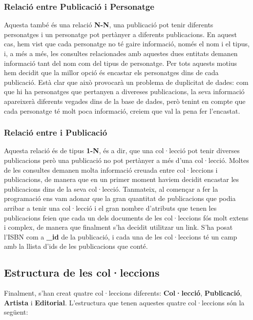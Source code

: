 \documentclass{article}
\begin{document}
\subsubsection*{Relaci\'o entre \textbf{Publicaci\'o} i \textbf{Personatge}}
Aquesta tamb\'e \'es una relaci\'o \textbf{N-N}, una publicaci\'o pot tenir diferents personatges i un personatge pot pert\`anyer a diferents publicacions. En aquest cas, hem vist que cada personatge no t\'e gaire informaci\'o, nom\'es el nom i el tipus, i, a m\'es a m\'es, les consultes relacionades amb aquestes dues entitats demanen informaci\'o tant del nom com del tipus de personatge. Per tots aquests motius hem decidit que la millor opci\'o \'es encastar els personatges dins de cada publicaci\'o. Est\`a clar que aix\`o provocar\`a un problema de duplicitat de dades: com que hi ha personatges que pertanyen a divereses publicacions, la seva informaci\'o apareixer\`a diferents vegades dins de la base de dades, per\`o tenint en compte que cada personatge t\'e molt poca informaci\'o, creiem que val la pena fer l'encastat.

\subsubsection*{Relaci\'o entre  i {Publicaci\'o}}
Aquesta relaci\'o \'es de tipus \textbf{1-N}, \'es a dir, que una col·lecci\'o pot tenir diverses publicacions per\`o una publicaci\'o no pot pert\`anyer a m\'es d'una col·lecci\'o. Moltes de les consultes demanen molta informaci\'o creuada entre col·leccions i publicacions, de manera que en un primer moment haviem decidit encastar les publicacions dins de la seva col·lecci\'o. Tanmateix, al començar a fer la programaci\'o ens vam adonar que la gran quantitat de publicacions que podia arribar a tenir una col·lecci\'o i el gran nombre d'atributs que tenen les publicacions feien que cada un dels documents de les col·leccions f\'os molt extens i complex, de manera que finalment s'ha decidit utilitzar un link. S'ha posat l'ISBN com a \textbf{\_id} de la publicaci\'o, i cada una de les col·leccions t\'e un camp amb la llista d'ids de les publicacions que cont\'e.

\subsection{Estructura de les col·leccions}
Finalment, s'han creat quatre col·leccions diferents: \textbf{Col·lecci\'o}, \textbf{Publicaci\'o}, \textbf{Artista} i \textbf{Editorial}. L'estructura que tenen aquestes quatre col·leccions s\'on la seg\"uent:
\end{document}
